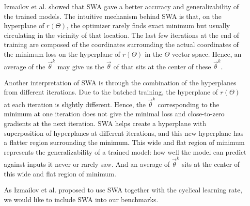 Izmailov et al. \cite{izmailov_averaging_2019} showed that SWA gave a better accuracy and generalizability of the trained models.
The intuitive mechanism behind SWA is that, on the hyperplane of $r(\Theta)$, the optimizer rarely finds exact minimum but usually circulating in the vicinity of that location.
The last few iterations at the end of training are composed of the coordinates surrounding the actual coordinates of the minimum loss on the hyperplane of $r(\Theta)$ in the $\Theta$ vector space.
Hence, an average of the $\vec{\theta}^k$ may give us the $\vec{\theta}$ of that sits at the center of these $\vec{\theta}^k$.

Another interpretation of SWA is through the combination of the hyperplanes from different iterations.
Due to the batched training, the hyperplane of $r(\Theta)$ at each iteration is slightly different.
Hence, the $\vec{\theta}^k$ corresponding to the minimum at one iteration does not give the minimal loss and close-to-zero gradients at the next iteration.
SWA helps create a hyperplane with superposition of hyperplanes at different iterations, and this new hyperplane has a flatter region surrounding the minimum.
This wide and flat region of minimum represents the generalizability of a trained model: how well the model can predict against inputs it never or rarely saw.
And an average of $\vec{\theta}^k$ sits at the center of this wide and flat region of minimum.

As Izmailov et al. proposed to use SWA together with the cyclical learning rate, we would like to include SWA into our benchmarks.